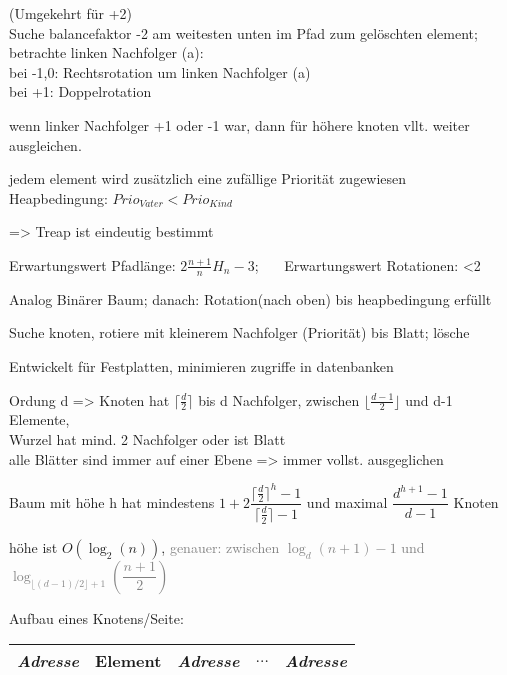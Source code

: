 (Umgekehrt für +2)\\
Suche balancefaktor -2 am weitesten unten im Pfad zum gelöschten element;\\
betrachte linken Nachfolger (a):\\
bei -1,0: Rechtsrotation um linken Nachfolger (a)\\
bei +1: Doppelrotation

wenn linker Nachfolger +1 oder -1 war, dann für höhere knoten vllt. weiter ausgleichen.





jedem element wird zusätzlich eine zufällige Priorität zugewiesen\\
Heapbedingung: $Prio_{Vater} < Prio_{Kind}$

=> Treap ist eindeutig bestimmt

Erwartungswert Pfadlänge: $2\frac{n+1}{n}H_n-3$; ~~~Erwartungswert Rotationen: <2 

Analog Binärer Baum; danach: Rotation(nach oben) bis heapbedingung erfüllt

Suche knoten, rotiere mit kleinerem Nachfolger (Priorität) bis Blatt; lösche


\renewcommand{\min}{\lceil\frac{d}{2}\rceil}
\newcommand{\mincontent}{\lfloor\frac{d-1}{2}\rfloor}
Entwickelt für Festplatten, minimieren zugriffe in datenbanken

Ordung d => Knoten hat $\min$ bis d Nachfolger, zwischen $\mincontent$ und d-1 Elemente,\\
Wurzel hat mind. 2 Nachfolger oder ist Blatt \\
alle Blätter sind immer auf einer Ebene => immer vollst. ausgeglichen 

Baum mit höhe h hat mindestens $1+2\dfrac{\min^h - 1}{\min -1}$ und maximal $ \dfrac{d^{h+1}-1}{d-1}$ Knoten

höhe ist $O(\log_2(n))$, \textcolor{gray}{genauer: zwischen $\log_d(n+1)-1$ und $\log_{\lfloor(d-1)/2\rfloor+1}\left(\dfrac{n+1}{2}\right)$}

Aufbau eines Knotens/Seite:
\begin{tabular}{|c|c|c|c|c|}
\hline
\textit{Adresse} & Element & \textit{Adresse} & $\dots$ & \textit{Adresse}\\
\hline
\end{tabular}

